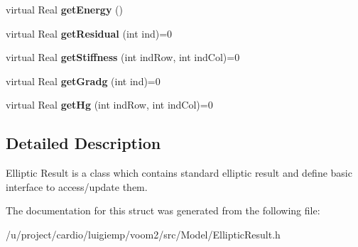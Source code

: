 \begin{DoxyCompactItemize}
\item 
\hypertarget{structvoom_1_1_elliptic_result_aefec9b543f8f5f93f5227a4f4155eb4b}{
virtual Real {\bfseries getEnergy} ()}
\label{structvoom_1_1_elliptic_result_aefec9b543f8f5f93f5227a4f4155eb4b}

\item 
\hypertarget{structvoom_1_1_elliptic_result_a9e66fe4e4c59393074ffa5c62971e494}{
virtual Real {\bfseries getResidual} (int ind)=0}
\label{structvoom_1_1_elliptic_result_a9e66fe4e4c59393074ffa5c62971e494}

\item 
\hypertarget{structvoom_1_1_elliptic_result_a550064e0b125ccf044e50b434224ea64}{
virtual Real {\bfseries getStiffness} (int indRow, int indCol)=0}
\label{structvoom_1_1_elliptic_result_a550064e0b125ccf044e50b434224ea64}

\item 
\hypertarget{structvoom_1_1_elliptic_result_a01fa418b925834e4c736368320930e02}{
virtual Real {\bfseries getGradg} (int ind)=0}
\label{structvoom_1_1_elliptic_result_a01fa418b925834e4c736368320930e02}

\item 
\hypertarget{structvoom_1_1_elliptic_result_ab1a31fbdf0d66a183c6dad36a48efa12}{
virtual Real {\bfseries getHg} (int indRow, int indCol)=0}
\label{structvoom_1_1_elliptic_result_ab1a31fbdf0d66a183c6dad36a48efa12}

\end{DoxyCompactItemize}


\subsection{Detailed Description}
Elliptic Result is a class which contains standard elliptic result and define basic interface to access/update them. 

The documentation for this struct was generated from the following file:\begin{DoxyCompactItemize}
\item 
/u/project/cardio/luigiemp/voom2/src/Model/EllipticResult.h\end{DoxyCompactItemize}
